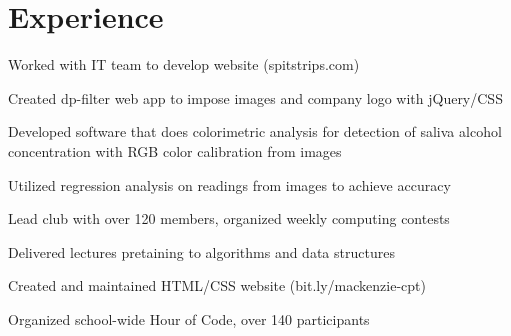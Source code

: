 \documentclass[]{deedy-resume-openfont}
\begin{document}
\hfill
\begin{minipage}[t]{0.66\textwidth} 


\section{Experience}

\vspace{\topsep}
\begin{tightemize}
\item Worked with IT team to develop website (spitstrips.com)
\item Created dp-filter web app to impose images and company logo with jQuery/CSS
\item Developed software that does colorimetric analysis for detection of saliva alcohol concentration with RGB color calibration from images
\item Utilized regression analysis on readings from images to achieve accuracy
\end{tightemize}
\sectionsep

\begin{tightemize}
\item Lead club with over 120 members, organized weekly computing contests
\item Delivered lectures pretaining to algorithms and data structures
\item Created and maintained HTML/CSS website (bit.ly/mackenzie-cpt)
\item Organized school-wide Hour of Code, over 140 participants
\end{tightemize}
\sectionsep



\end{minipage}
\end{document}
